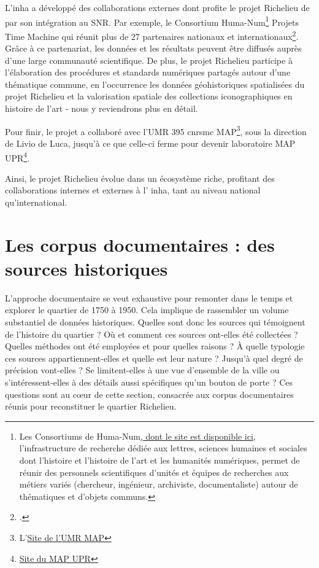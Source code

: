 L'\acrshort{inha} a développé des collaborations externes dont profite le projet Richelieu de par son intégration au SNR. Par exemple, le Consortium Huma-Num\footnote{Les Consortiums de Huma-Num\href{https://www.huma-num.fr/les-consortiums-hn/}{, dont le site est disponible ici}, l'infrastructure de recherche dédiée aux lettres, sciences humaines et sociales dont l'histoire et l'histoire de l'art et les humanités numériques, permet de réunir des personnels scientifiques d'unités et équipes de recherches aux métiers variés (chercheur, ingénieur, archiviste, documentaliste) autour de thématiques et d'objets communs.} Projets Time Machine qui réunit plus de 27 partenaires nationaux et internationaux\footcite{CSTPTMDemande2022}. Grâce à ce partenariat, les données et les résultats peuvent être diffusés auprès d'une large communauté scientifique. De plus, le projet Richelieu participe à l'élaboration des procédures et standards numériques partagés autour d'une thématique commune, en l'occurrence les données géohistoriques spatialisées du projet Richelieu et la valorisation spatiale des collections iconographiques en histoire de l'art - nous y reviendrons plus en détail.

Pour finir, le projet a collaboré avec l'UMR 395 \acrshort{cnrsmc} MAP\footnote{L'\href{https://www.map.cnrs.fr/fr/le-laboratoire/historique/ancienne-umr-3495/}{Site de l'UMR MAP}}, sous la direction de Livio de Luca, jusqu'à ce que celle-ci ferme pour devenir laboratoire MAP UPR\footnote{\href{https://www.map.cnrs.fr/}{Site du MAP UPR}}.

Ainsi, le projet Richelieu évolue dans un écosystème riche, profitant des collaborations internes et externes à l' \acrshort{inha}, tant au niveau national qu'international. 

\section{Les corpus documentaires : des sources historiques}
L'approche documentaire se veut exhaustive pour remonter dans le temps et explorer le quartier de 1750 à 1950. Cela implique de rassembler un volume substantiel de données historiques. Quelles sont donc les sources qui témoignent de l'histoire du quartier ? Où et comment ces sources ont-elles été collectées ? Quelles méthodes ont été employées et pour quelles raisons ? À quelle typologie ces sources appartiennent-elles et quelle est leur nature ? Jusqu'à quel degré de précision vont-elles ? Se limitent-elles à une vue d'ensemble de la ville ou s'intéressent-elles à des détails aussi spécifiques qu'un bouton de porte ? Ces questions sont au cœur de cette section, consacrée aux corpus documentaires réunis pour reconstituer le quartier Richelieu.

